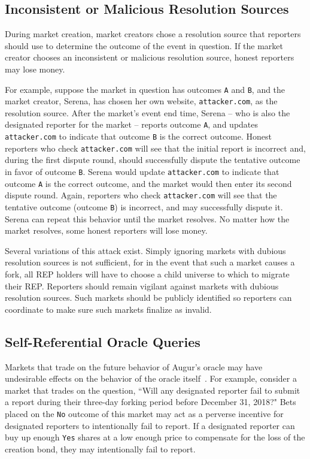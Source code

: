 \documentclass[floatfix,reprint,nofootinbib,amsmath,amssymb,epsfig,pre,floats,letterpaper,groupedaffiliation]{revtex4-1}
\theoremstyle{definition}
\theoremstyle{definition}
\begin{document}
\subsection{Inconsistent or Malicious Resolution Sources}

During market creation, market creators chose a resolution source that reporters should use to determine the outcome of the event in question.  If the market creator chooses an inconsistent or malicious resolution source, honest reporters may lose money.

For example, suppose the market in question has outcomes \texttt{A} and \texttt{B}, and the market creator, Serena, has chosen her own website, \texttt{attacker.com}, as the resolution source.  After the market's event end time, Serena -- who is also the designated reporter for the market -- reports outcome \texttt{A}, and updates \texttt{attacker.com} to indicate that outcome \texttt{B} is the correct outcome.  Honest reporters who check \texttt{attacker.com} will see that the initial report is incorrect and, during the first dispute round, should successfully dispute the tentative outcome in favor of outcome \texttt{B}.  Serena would update \texttt{attacker.com} to indicate that outcome \texttt{A} is the correct outcome, and the market would then enter its second dispute round.  Again, reporters who check \texttt{attacker.com} will see that the tentative outcome (outcome \texttt{B}) is incorrect, and may successfully dispute it.  Serena can repeat this behavior until the market resolves.  No matter how the market resolves, some honest reporters will lose money.

Several variations of this attack exist.  Simply ignoring markets with dubious resolution sources is not sufficient, for in the event that such a market causes a fork, all REP holders will have to choose a child universe to which to migrate their REP.  Reporters should remain vigilant against markets with dubious resolution sources.  Such markets should be publicly identified so reporters can coordinate to make sure such markets finalize as invalid.

\subsection{Self-Referential Oracle Queries}

Markets that trade on the future behavior of Augur's oracle may have undesirable effects on the behavior of the oracle itself~\cite{Othman_2010}.  For example, consider a market that trades on the question, ``Will any designated reporter fail to submit a report during their three-day forking period before December 31, 2018?"  Bets placed on the \texttt{No} outcome of this market may act as a perverse incentive for designated reporters to intentionally fail to report.  If a designated reporter can buy up enough \texttt{Yes} shares at a low enough price to compensate for the loss of the creation bond, they may intentionally fail to report.
\end{document}
